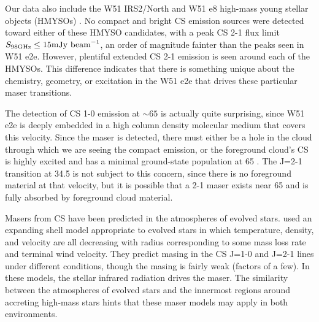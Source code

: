 \documentclass[twocolumn]{aastex62}
\begin{document}
Our data also include the W51 IRS2/North and W51 e8 high-mass young stellar
objects (HMYSOs) \citep{Ginsburg2017a}.  No compact and bright CS emission
sources were detected
toward either of these HMYSO candidates, with a peak CS 2-1 flux limit ${S_{98
\mathrm{GHz}} \leq 15 \mathrm{mJy~\textrm{beam}^{-1}}}$, an order of magnitude fainter
than the peaks seen in W51 e2e.  However, plentiful extended CS 2-1 emission is
seen around each of the HMYSOs.  This difference indicates that there is
something unique about the chemistry, geometry, or excitation in the W51 e2e
that drives these particular maser transitions.


The detection of CS 1-0 emission at $\sim65$ \kms is actually quite surprising,
since W51 e2e is deeply embedded in a high column density molecular medium that
covers this velocity.  
Since the maser is detected, there must either be a hole
in the cloud through which we are seeing the compact emission, or the
foreground cloud's CS
is highly excited and has a minimal ground-state population at 65 \kms. 
The J=2-1 transition at 34.5 \kms is not
subject to this concern, since there is no foreground material at that
velocity, but it is possible that a 2-1 maser exists near 65 \kms and is fully
absorbed by foreground cloud material.


Masers from CS have been predicted in the atmospheres of evolved stars.
\citet{Schoenberg1988a}
used an expanding shell model appropriate to evolved stars in which
temperature, density, and velocity are all decreasing with radius corresponding
to some mass loss rate and terminal wind velocity. They predict masing in the
CS J=1-0 and J=2-1 lines under different conditions, though the masing is
fairly weak (factors of a few).  In these models, the stellar infrared
radiation drives the maser.  The similarity between the atmospheres
of evolved stars and the innermost regions around accreting high-mass stars
hints that these maser models may apply in both environments.

\end{document}
